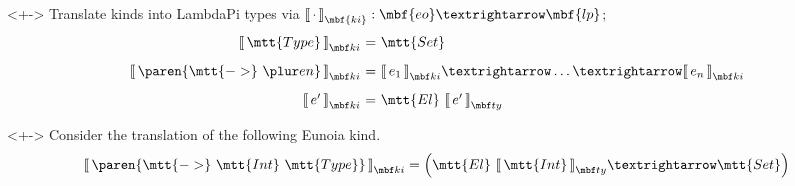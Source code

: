\documentclass[lualatex, compress, 12pt, handout]{beamer}
\begin{document}

\begin{frame}
	\begin{uncoverenv}<+->
		Translate \alert{kinds} into LambdaPi types via
		${\tra\cdot}_{\mbf{ki}} : \mbf{eo} → \mbf{lp}$;
		$$
			\begin{array}{r@{\ =\ }l}
				\ki{\mtt{Type}}                    & \mtt{Set} \\[3mm]

				\ki{\paren{\mtt{->}\ {\plur e n}}} &
				\ki{e_1} → \ldots → \ki{e_n}                   \\[3mm]

				\ki{e'}                            &
				\mtt{El}\ \ty{e'}
			\end{array}
		$$
		\begin{uncoverenv}<+->%
			\exxample Consider the translation of the following Eunoia kind.
			$$
				\ki{\paren{\mtt{->}\ \mtt{Int}\ \mtt{Type}}} =
				\left(\mtt{El}\ \ty{\mtt{Int}} → \mtt{Set}\right)
			$$
		\end{uncoverenv}
	\end{uncoverenv}
\end{frame}
\end{document}
